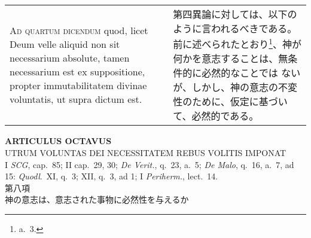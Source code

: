 \documentclass[10pt]{jsarticle} %
\begin{document}
\begin{longtable}{p{21em}p{21em}}
\\



{\scshape Ad quartum dicendum} quod, licet Deum velle
 aliquid non sit necessarium absolute, tamen necessarium est ex
 suppositione, propter immutabilitatem divinae voluntatis, ut supra
 dictum est.


&

第四異論に対しては、以下のように言われるべきである。
前に述べられたとおり\footnote{a.~3.}、神が何かを意志することは、無条件的に必然的なことでは
 ないが、しかし、神の意志の不変性のために、仮定に基づいて、必然的である。



\end{longtable}
\newpage



\begin{center}
 {\Large {\bf ARTICULUS OCTAVUS}}\\
 {\large UTRUM VOLUNTAS DEI NECESSITATEM REBUS VOLITIS IMPONAT}\\
 {\footnotesize I {\itshape SCG}, cap.~85; II cap.~29, 30; {\itshape De
 Verit.}, q.~23, a.~5; {\itshape De Malo}, q.~16, a.~7, ad 15: {\itshape
 Quodl}.~XI, q.~3; XII, q.~3, ad 1; I {\itshape Periherm.}, lect.~14.}\\
 {\Large 第八項\\神の意志は、意志された事物に必然性を与えるか}
\end{center}
\end{document}
